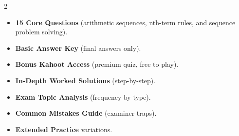 \documentclass[11pt,a4paper]{article}
\newcommand{\FullReleaseDate}{April 30, 2026}
\begin{document}
\vspace{8pt}

\begin{multicols}{2}
  \begin{tcolorbox}[card, title=\sffamily\bfseries\textcolor{white}{\faHandPointDown\ TODAY (Simplified Version)}, colbacktitle=mainblue, boxed title style={sharp corners, boxrule=0pt}]
    \begin{itemize}[leftmargin=1.2em, itemsep=2pt]
      \item \small \textbf{15 Core Questions} (arithmetic sequences, nth-term rules, and sequence problem solving).
      \item \small \textbf{Basic Answer Key} (final answers only).
      \item \small \textbf{Bonus Kahoot Access} (premium quiz, free to play).
    \end{itemize}
  \end{tcolorbox}

  \columnbreak

  \begin{tcolorbox}[card, title=\sffamily\bfseries\textcolor{white}{\faRocket\ ON \FullReleaseDate\ (Full Upgrade)}, colbacktitle=mainblue, boxed title style={sharp corners, boxrule=0pt}]
    \begin{itemize}[leftmargin=1.2em, itemsep=2pt]
      \item \small \textbf{In-Depth Worked Solutions} (step-by-step).
      \item \small \textbf{Exam Topic Analysis} (frequency by type).
      \item \small \textbf{Common Mistakes Guide} (examiner traps).
      \item \small \textbf{Extended Practice} variations.
    \end{itemize}
  \end{tcolorbox}
\end{multicols}
\end{document}
